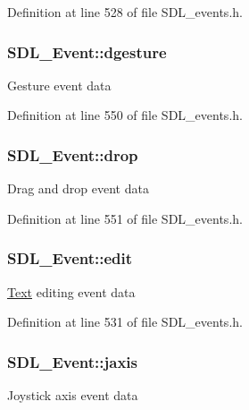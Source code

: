 Definition at line 528 of file S\-D\-L\-\_\-events.\-h.

\hypertarget{union_s_d_l___event_a4481167b9f8549aeb254e97ca812e74d}{
\subsubsection[{dgesture}]{ S\-D\-L\-\_\-\-Event\-::dgesture}}\label{union_s_d_l___event_a4481167b9f8549aeb254e97ca812e74d}
Gesture event data 

Definition at line 550 of file S\-D\-L\-\_\-events.\-h.

\hypertarget{union_s_d_l___event_acff77bccbca65abbb876360a3f5209c9}{
\subsubsection[{drop}]{ S\-D\-L\-\_\-\-Event\-::drop}}\label{union_s_d_l___event_acff77bccbca65abbb876360a3f5209c9}
Drag and drop event data 

Definition at line 551 of file S\-D\-L\-\_\-events.\-h.

\hypertarget{union_s_d_l___event_a9a7e3b67b2654d4c5fc509676c6a7183}{
\subsubsection[{edit}]{ S\-D\-L\-\_\-\-Event\-::edit}}\label{union_s_d_l___event_a9a7e3b67b2654d4c5fc509676c6a7183}
\hyperlink{class_text}{Text} editing event data 

Definition at line 531 of file S\-D\-L\-\_\-events.\-h.

\hypertarget{union_s_d_l___event_ac4611acd0e9c675e67dc20919f0accb4}{
\subsubsection[{jaxis}]{ S\-D\-L\-\_\-\-Event\-::jaxis}}\label{union_s_d_l___event_ac4611acd0e9c675e67dc20919f0accb4}
Joystick axis event data 

